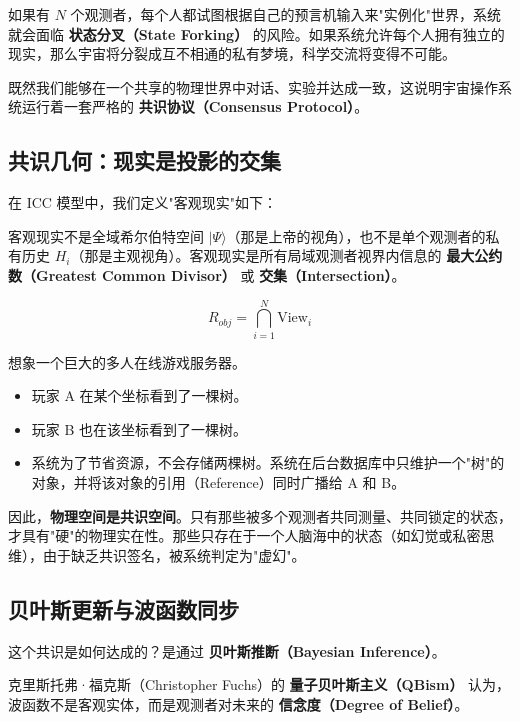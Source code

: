 如果有 $N$ 个观测者，每个人都试图根据自己的预言机输入来"实例化"世界，系统就会面临 \textbf{状态分叉（State Forking）} 的风险。如果系统允许每个人拥有独立的现实，那么宇宙将分裂成互不相通的私有梦境，科学交流将变得不可能。

既然我们能够在一个共享的物理世界中对话、实验并达成一致，这说明宇宙操作系统运行着一套严格的 \textbf{共识协议（Consensus Protocol）}。

\subsection{共识几何：现实是投影的交集}

在 ICC 模型中，我们定义"客观现实"如下：

\begin{definition}[客观现实]
客观现实不是全域希尔伯特空间 $|\Psi\rangle$（那是上帝的视角），也不是单个观测者的私有历史 $H_i$（那是主观视角）。客观现实是所有局域观测者视界内信息的 \textbf{最大公约数（Greatest Common Divisor）} 或 \textbf{交集（Intersection）}。

\begin{equation}
R_{obj} = \bigcap_{i=1}^N \text{View}_i
\end{equation}
\end{definition}

想象一个巨大的多人在线游戏服务器。

\begin{itemize}
\item 玩家 A 在某个坐标看到了一棵树。

\item 玩家 B 也在该坐标看到了一棵树。

\item 系统为了节省资源，不会存储两棵树。系统在后台数据库中只维护一个"树"的对象，并将该对象的引用（Reference）同时广播给 A 和 B。
\end{itemize}

因此，\textbf{物理空间是共识空间}。只有那些被多个观测者共同测量、共同锁定的状态，才具有"硬"的物理实在性。那些只存在于一个人脑海中的状态（如幻觉或私密思维），由于缺乏共识签名，被系统判定为"虚幻"。

\subsection{贝叶斯更新与波函数同步}

这个共识是如何达成的？是通过 \textbf{贝叶斯推断（Bayesian Inference）}。

克里斯托弗·福克斯（Christopher Fuchs）的 \textbf{量子贝叶斯主义（QBism）} 认为，波函数不是客观实体，而是观测者对未来的 \textbf{信念度（Degree of Belief）}。

